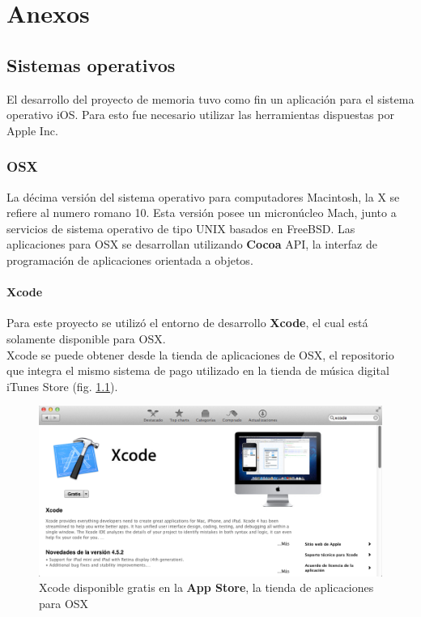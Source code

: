 \chapter{Anexos}
	\section{Sistemas operativos}
	El desarrollo del proyecto de memoria tuvo como fin un aplicación para el sistema operativo iOS. Para esto fue necesario utilizar las herramientas dispuestas por Apple Inc.
		\subsection{OSX}
La décima versión del sistema operativo para computadores Macintosh, la X se refiere al numero romano 10. Esta versión posee un micronúcleo Mach, junto a servicios de sistema operativo de tipo UNIX basados en FreeBSD.
Las aplicaciones para OSX se desarrollan utilizando \textbf{Cocoa} API, la interfaz de programación de aplicaciones orientada a objetos.
\subsubsection{Xcode}
Para este proyecto se utilizó el entorno de desarrollo \textbf{Xcode}, el cual está solamente disponible para OSX.\\

Xcode se puede obtener desde la tienda de aplicaciones de OSX, el repositorio que integra el mismo sistema de pago utilizado en la tienda de música digital iTunes Store (fig. \ref{fig:xcode-appstore}).
\begin{figure}[H]
	\centering
	\includegraphics[scale=0.41]{imgs/xcode-appstore.png} 
	\caption{Xcode disponible gratis en la \textbf{App Store}, la tienda de aplicaciones para OSX}
	\label{fig:xcode-appstore}
\end{figure}  
